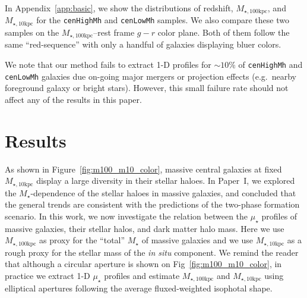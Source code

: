 \documentclass[a4paper,fleqn,usenatbib]{mnras}
\def\etal{{\ et al.~}}
\def\rbcg{\texttt{cenHighMh}}
\def\nbcg{\texttt{cenLowMh}}
\def\mstar{{$M_{\star}$}}
\def\minn{{$M_{\star,10\mathrm{kpc}}$}}
\def\mtot{{$M_{\star,100\mathrm{kpc}}$}}
\def\mden{{$\mu_{\star}$}}
\begin{document}
    In Appendix~\ref{app:basic}, we show the distributions of redshift, \mtot{}, and 
    \minn{} for the \rbcg{} and \nbcg{} samples. 
    We also compare these two samples on the \mtot{}--rest frame $g-r$ color plane. 
    Both of them follow the same ``red-sequence'' with only a handful of galaxies 
    displaying bluer colors.
    
    We note that our method fails to extract 1-D profiles for $\sim10$\% of 
    \rbcg{} and \nbcg{} galaxies due on-going major mergers or projection effects 
    (e.g.\ nearby foreground galaxy or bright stars). 
    However, this small failure rate should not affect any of the results in this paper.
    

\section{Results}
    \label{sec:result}
    
    As shown in Figure~\ref{fig:m100_m10_color}, massive central galaxies at fixed  
    \minn{} display a large diversity in their stellar haloes. 
    In Paper~I, we explored the \mstar{}-dependence of the stellar haloes in massive 
    galaxies, and concluded that the general trends are consistent with the predictions 
    of the two-phase formation scenario. 
    In this work, we now investigate the relation between the \mden{} profiles of 
    massive galaxies, their stellar halos, and dark matter halo mass. 
    Here we use \mtot{} as proxy for the ``total'' \mstar{} of massive galaxies and 
    we use \minn{} as a rough proxy for the stellar mass of the \textit{in situ} 
    component.  
    We remind the reader that although a circular aperture is shown on 
    Fig~\ref{fig:m100_m10_color}, in practice we extract 1-D \mden{} profiles and 
    estimate \mtot{} and \minn{} using elliptical apertures following the average 
    fluxed-weighted isophotal shape. 
   

\end{document}
